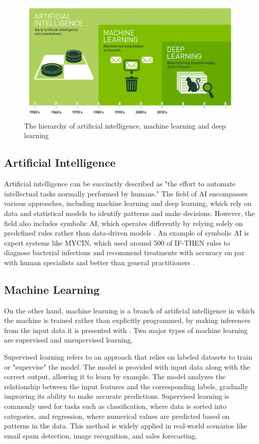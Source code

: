 \documentclass[licencjacka,en]{pracamgr}
\begin{document}
\begin{figure}
    \centering
    \includegraphics[width=0.5\linewidth]{bachelor_images/nvidia_ai_hierarchy.png}
    \caption{The hierarchy of artificial intelligence, machine learning and deep learning \cite{francuz}}
    \label{fig:hierarchy-ai-ml-dl}
\end{figure}

\subsection{Artificial Intelligence}
Artificial intelligence can be succinctly described as "the effort to automate intellectual tasks normally performed by humans." The field of AI encompasses various approaches, including machine learning and deep learning, which rely on data and statistical models to identify patterns and make decisions. However, the field also includes symbolic AI, which operates differently by relying solely on predefined rules rather than data-driven models \cite{francuz}. An example of symbolic AI is expert systems like MYCIN, which used around 500 of IF-THEN rules to diagnose bacterial infections and recommend treatments with accuracy on par with human specialists and better than general practitioners \cite{mycin}.

\subsection{Machine Learning}
On the other hand, machine learning is a branch of artificial intelligence in which the machine is trained rather than explicitly programmed, by making inferences from the input data it is presented with \cite{francuz}. Two major types of machine learning are supervised and unsupervised learning. 

Supervised learning refers to an approach that relies on labeled datasets to train or "supervise" the model. The model is provided with input data along with the correct output, allowing it to learn by example. The model analyzes the relationship between the input features and the corresponding labels, gradually improving its ability to make accurate predictions. Supervised learning is commonly used for tasks such as classification, where data is sorted into categories, and regression, where numerical values are predicted based on patterns in the data. This method is widely applied in real-world scenarios like email spam detection, image recognition, and sales forecasting. 
\end{document}
